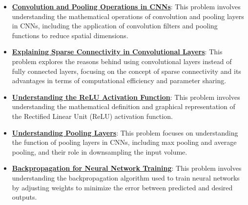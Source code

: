 \documentclass{article}%
\begin{document}
\begin{itemize}[leftmargin=*]
\item \href{https://purdue.brightspace.com/d2l/common/assets/pdfjs-d2l-dist/1.0.14-legacy/web/viewer.html?file=\%2Fcontent\%2Fenforced\%2F1095467-wl.202510.CS.24300.001\%2F09L1-cnn.pdf\%3Fou\%3D1095467\&lang=en-us\&container=d2l-fileviewer-rendered-pdf\&fullscreen=d2l-fileviewer-rendered-pdf-dialog\&height=667#page=6}{\textbf{Convolution and Pooling Operations in CNNs}}: This problem involves understanding the mathematical operations of convolution and pooling layers in CNNs, including the application of convolution filters and pooling functions to reduce spatial dimensions.%
\item \href{https://purdue.brightspace.com/d2l/common/assets/pdfjs-d2l-dist/1.0.14-legacy/web/viewer.html?file=\%2Fcontent\%2Fenforced\%2F1095467-wl.202510.CS.24300.001\%2F09L1-cnn.pdf\%3Fou\%3D1095467\&lang=en-us\&container=d2l-fileviewer-rendered-pdf\&fullscreen=d2l-fileviewer-rendered-pdf-dialog\&height=667#page=10}{\textbf{Explaining Sparse Connectivity in Convolutional Layers}}: This problem explores the reasons behind using convolutional layers instead of fully connected layers, focusing on the concept of sparse connectivity and its advantages in terms of computational efficiency and parameter sharing.%
\item \href{https://purdue.brightspace.com/d2l/common/assets/pdfjs-d2l-dist/1.0.14-legacy/web/viewer.html?file=\%2Fcontent\%2Fenforced\%2F1095467-wl.202510.CS.24300.001\%2F09L1-cnn.pdf\%3Fou\%3D1095467\&lang=en-us\&container=d2l-fileviewer-rendered-pdf\&fullscreen=d2l-fileviewer-rendered-pdf-dialog\&height=667#page=13}{\textbf{Understanding the ReLU Activation Function}}: This problem involves understanding the mathematical definition and graphical representation of the Rectified Linear Unit (ReLU) activation function.%
\item \href{https://purdue.brightspace.com/d2l/common/assets/pdfjs-d2l-dist/1.0.14-legacy/web/viewer.html?file=\%2Fcontent\%2Fenforced\%2F1095467-wl.202510.CS.24300.001\%2F09L1-cnn.pdf\%3Fou\%3D1095467\&lang=en-us\&container=d2l-fileviewer-rendered-pdf\&fullscreen=d2l-fileviewer-rendered-pdf-dialog\&height=667#page=14}{\textbf{Understanding Pooling Layers}}: This problem focuses on understanding the function of pooling layers in CNNs, including max pooling and average pooling, and their role in downsampling the input volume.%
\item \href{https://purdue.brightspace.com/d2l/common/assets/pdfjs-d2l-dist/1.0.14-legacy/web/viewer.html?file=\%2Fcontent\%2Fenforced\%2F1095467-wl.202510.CS.24300.001\%2F09L1-cnn.pdf\%3Fou\%3D1095467\&lang=en-us\&container=d2l-fileviewer-rendered-pdf\&fullscreen=d2l-fileviewer-rendered-pdf-dialog\&height=667#page=16}{\textbf{Backpropagation for Neural Network Training}}: This problem involves understanding the backpropagation algorithm used to train neural networks by adjusting weights to minimize the error between predicted and desired outputs.%

\end{itemize}
\end{document}
